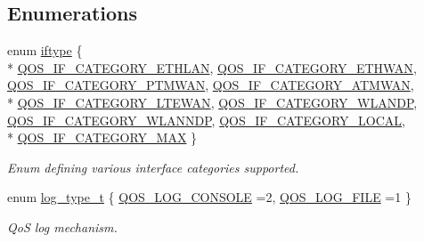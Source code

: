 \subsection*{Enumerations}
\begin{DoxyCompactItemize}
\item 
enum \hyperlink{group__FAPI__QOS__GENERAL_ga6da5ac0600c64e9e1a79cd25a4a18680}{iftype} \{ \\*
\hyperlink{group__FAPI__QOS__GENERAL_gga6da5ac0600c64e9e1a79cd25a4a18680a3f4cfcc9a5bc49c9203f41ca90a1dee7}{Q\-O\-S\-\_\-\-I\-F\-\_\-\-C\-A\-T\-E\-G\-O\-R\-Y\-\_\-\-E\-T\-H\-L\-A\-N}, 
\hyperlink{group__FAPI__QOS__GENERAL_gga6da5ac0600c64e9e1a79cd25a4a18680a91d47780ef7ca4d597796b4f8d496419}{Q\-O\-S\-\_\-\-I\-F\-\_\-\-C\-A\-T\-E\-G\-O\-R\-Y\-\_\-\-E\-T\-H\-W\-A\-N}, 
\hyperlink{group__FAPI__QOS__GENERAL_gga6da5ac0600c64e9e1a79cd25a4a18680aa2ab44c305536466712569878893f08b}{Q\-O\-S\-\_\-\-I\-F\-\_\-\-C\-A\-T\-E\-G\-O\-R\-Y\-\_\-\-P\-T\-M\-W\-A\-N}, 
\hyperlink{group__FAPI__QOS__GENERAL_gga6da5ac0600c64e9e1a79cd25a4a18680a8ed7680bc33be5a05122e5b90a6b47b0}{Q\-O\-S\-\_\-\-I\-F\-\_\-\-C\-A\-T\-E\-G\-O\-R\-Y\-\_\-\-A\-T\-M\-W\-A\-N}, 
\\*
\hyperlink{group__FAPI__QOS__GENERAL_gga6da5ac0600c64e9e1a79cd25a4a18680a89f8c2e2ae52f8cbf784f7b981d0c3ca}{Q\-O\-S\-\_\-\-I\-F\-\_\-\-C\-A\-T\-E\-G\-O\-R\-Y\-\_\-\-L\-T\-E\-W\-A\-N}, 
\hyperlink{group__FAPI__QOS__GENERAL_gga6da5ac0600c64e9e1a79cd25a4a18680a4c4c6095859075c080d4696c27a11261}{Q\-O\-S\-\_\-\-I\-F\-\_\-\-C\-A\-T\-E\-G\-O\-R\-Y\-\_\-\-W\-L\-A\-N\-D\-P}, 
\hyperlink{group__FAPI__QOS__GENERAL_gga6da5ac0600c64e9e1a79cd25a4a18680a738d70bd8a77dd636f9ac0db5ec0d1cf}{Q\-O\-S\-\_\-\-I\-F\-\_\-\-C\-A\-T\-E\-G\-O\-R\-Y\-\_\-\-W\-L\-A\-N\-N\-D\-P}, 
\hyperlink{group__FAPI__QOS__GENERAL_gga6da5ac0600c64e9e1a79cd25a4a18680a29df4fb22495cecca68b23d855ed46eb}{Q\-O\-S\-\_\-\-I\-F\-\_\-\-C\-A\-T\-E\-G\-O\-R\-Y\-\_\-\-L\-O\-C\-A\-L}, 
\\*
\hyperlink{group__FAPI__QOS__GENERAL_gga6da5ac0600c64e9e1a79cd25a4a18680a2ff3acdce4f2875869010dc41ef56624}{Q\-O\-S\-\_\-\-I\-F\-\_\-\-C\-A\-T\-E\-G\-O\-R\-Y\-\_\-\-M\-A\-X}
 \}
\begin{DoxyCompactList}\small\item\em Enum defining various interface categories supported. \end{DoxyCompactList}\item 
enum \hyperlink{group__FAPI__QOS__GENERAL_gaf8da7b968cb9659aef1acb8c79ff7250}{log\-\_\-type\-\_\-t} \{ \hyperlink{group__FAPI__QOS__GENERAL_ggaf8da7b968cb9659aef1acb8c79ff7250a7264ac0af0559275987af6d7fc9180f8}{Q\-O\-S\-\_\-\-L\-O\-G\-\_\-\-C\-O\-N\-S\-O\-L\-E} =2, 
\hyperlink{group__FAPI__QOS__GENERAL_ggaf8da7b968cb9659aef1acb8c79ff7250a6fdbe9e54ade3cac89351e3a8dd67ae0}{Q\-O\-S\-\_\-\-L\-O\-G\-\_\-\-F\-I\-L\-E} =1
 \}
\begin{DoxyCompactList}\small\item\em Qo\-S log mechanism. \end{DoxyCompactList}\end{DoxyCompactItemize}
